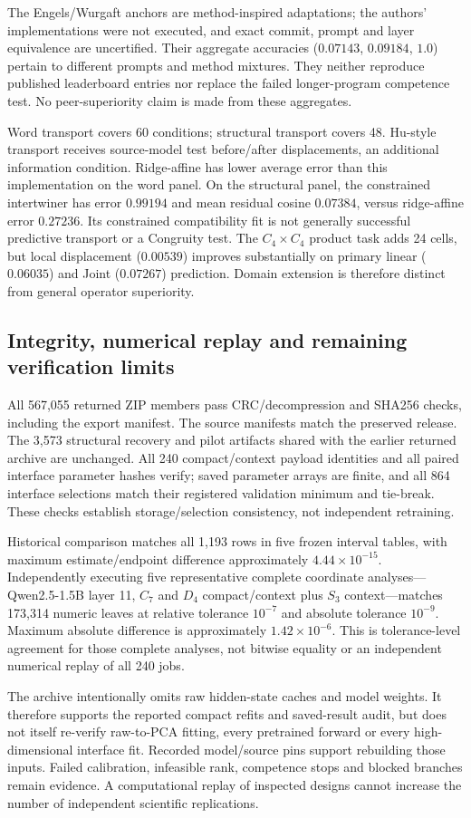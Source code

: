 The Engels/Wurgaft anchors are method-inspired adaptations; the authors' implementations were not executed, and exact commit, prompt and layer equivalence are uncertified. Their aggregate accuracies ($0.07143$, $0.09184$, $1.0$) pertain to different prompts and method mixtures. They neither reproduce published leaderboard entries nor replace the failed longer-program competence test. No peer-superiority claim is made from these aggregates.

Word transport covers 60 conditions; structural transport covers 48. Hu-style transport receives source-model test before/after displacements, an additional information condition. Ridge-affine has lower average error than this implementation on the word panel. On the structural panel, the constrained intertwiner has error $0.99194$ and mean residual cosine $0.07384$, versus ridge-affine error $0.27236$. Its constrained compatibility fit is not generally successful predictive transport or a Congruity test. The $C_4\times C_4$ product task adds 24 cells, but local displacement ($0.00539$) improves substantially on primary linear ($0.06035$) and Joint ($0.07267$) prediction. Domain extension is therefore distinct from general operator superiority.

\subsection{Integrity, numerical replay and remaining verification limits}
All 567,055 returned ZIP members pass CRC/decompression and SHA256 checks, including the export manifest. The source manifests match the preserved release. The 3,573 structural recovery and pilot artifacts shared with the earlier returned archive are unchanged. All 240 compact/context payload identities and all paired interface parameter hashes verify; saved parameter arrays are finite, and all 864 interface selections match their registered validation minimum and tie-break. These checks establish storage/selection consistency, not independent retraining.

Historical comparison matches all 1,193 rows in five frozen interval tables, with maximum estimate/endpoint difference approximately $4.44\times10^{-15}$. Independently executing five representative complete coordinate analyses---Qwen2.5-1.5B layer 11, $C_7$ and $D_4$ compact/context plus $S_3$ context---matches 173,314 numeric leaves at relative tolerance $10^{-7}$ and absolute tolerance $10^{-9}$. Maximum absolute difference is approximately $1.42\times10^{-6}$. This is tolerance-level agreement for those complete analyses, not bitwise equality or an independent numerical replay of all 240 jobs.

The archive intentionally omits raw hidden-state caches and model weights. It therefore supports the reported compact refits and saved-result audit, but does not itself re-verify raw-to-PCA fitting, every pretrained forward or every high-dimensional interface fit. Recorded model/source pins support rebuilding those inputs. Failed calibration, infeasible rank, competence stops and blocked branches remain evidence. A computational replay of inspected designs cannot increase the number of independent scientific replications.
